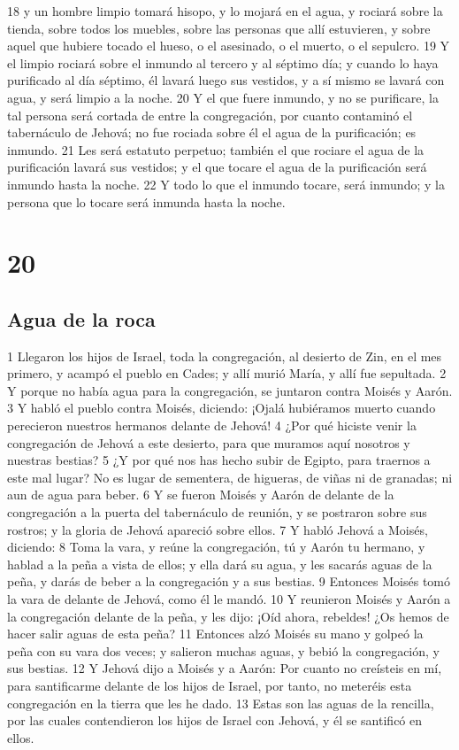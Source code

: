 18 y un hombre limpio tomará hisopo, y lo mojará en el agua, y rociará sobre la tienda, sobre todos los muebles, sobre las personas que allí estuvieren, y sobre aquel que hubiere tocado el hueso, o el asesinado, o el muerto, o el sepulcro.
19 Y el limpio rociará sobre el inmundo al tercero y al séptimo día; y cuando lo haya purificado al día séptimo, él lavará luego sus vestidos, y a sí mismo se lavará con agua, y será limpio a la noche.
20 Y el que fuere inmundo, y no se purificare, la tal persona será cortada de entre la congregación, por cuanto contaminó el tabernáculo de Jehová; no fue rociada sobre él el agua de la purificación; es inmundo.
21 Les será estatuto perpetuo; también el que rociare el agua de la purificación lavará sus vestidos; y el que tocare el agua de la purificación será inmundo hasta la noche.
22 Y todo lo que el inmundo tocare, será inmundo; y la persona que lo tocare será inmunda hasta la noche.

\chapter{20}

\section*{Agua de la roca}

1 Llegaron los hijos de Israel, toda la congregación, al desierto de Zin, en el mes primero, y acampó el pueblo en Cades; y allí murió María, y allí fue sepultada.
2 Y porque no había agua para la congregación, se juntaron contra Moisés y Aarón.
3 Y habló el pueblo contra Moisés, diciendo: ¡Ojalá hubiéramos muerto cuando perecieron nuestros hermanos delante de Jehová!
4 ¿Por qué hiciste venir la congregación de Jehová a este desierto, para que muramos aquí nosotros y nuestras bestias?
5 ¿Y por qué nos has hecho subir de Egipto, para traernos a este mal lugar? No es lugar de sementera, de higueras, de viñas ni de granadas; ni aun de agua para beber.
6 Y se fueron Moisés y Aarón de delante de la congregación a la puerta del tabernáculo de reunión, y se postraron sobre sus rostros; y la gloria de Jehová apareció sobre ellos.
7 Y habló Jehová a Moisés, diciendo:
8 Toma la vara, y reúne la congregación, tú y Aarón tu hermano, y hablad a la peña a vista de ellos; y ella dará su agua, y les sacarás aguas de la peña, y darás de beber a la congregación y a sus bestias.
9 Entonces Moisés tomó la vara de delante de Jehová, como él le mandó.
10 Y reunieron Moisés y Aarón a la congregación delante de la peña, y les dijo: ¡Oíd ahora, rebeldes! ¿Os hemos de hacer salir aguas de esta peña?
11 Entonces alzó Moisés su mano y golpeó la peña con su vara dos veces; y salieron muchas aguas, y bebió la congregación, y sus bestias.
12 Y Jehová dijo a Moisés y a Aarón: Por cuanto no creísteis en mí, para santificarme delante de los hijos de Israel, por tanto, no meteréis esta congregación en la tierra que les he dado.
13 Estas son las aguas de la rencilla, por las cuales contendieron los hijos de Israel con Jehová, y él se santificó en ellos.

